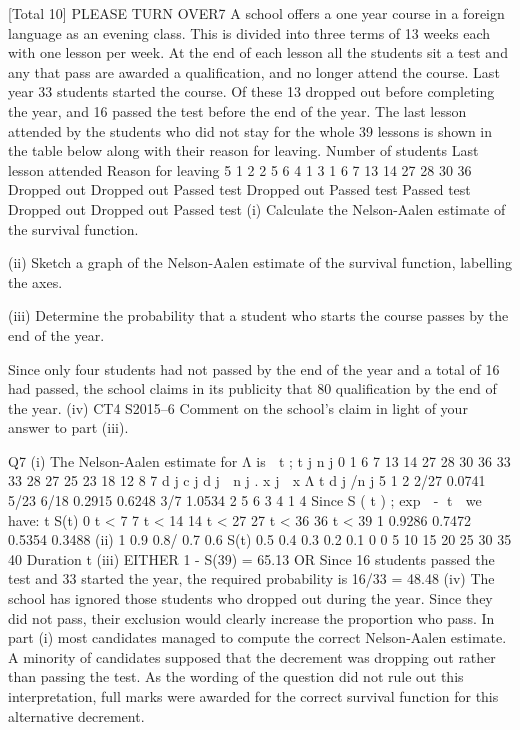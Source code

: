 [Total 10]
PLEASE TURN OVER7
A school offers a one year course in a foreign language as an evening class. This is divided into three terms of 13 weeks each with one lesson per week. At the end of
each lesson all the students sit a test and any that pass are awarded a qualification, and no longer attend the course.
Last year 33 students started the course. Of these 13 dropped out before completing the year, and 16 passed the test before the end of the year. The last lesson attended by
the students who did not stay for the whole 39 lessons is shown in the table below along with their reason for leaving.
Number of
students Last lesson
attended Reason for
leaving
5
1
2
2
5
6
4
1
3 1
6
7
13
14
27
28
30
36 Dropped out
Dropped out
Passed test
Dropped out
Passed test
Passed test
Dropped out
Dropped out
Passed test
(i) Calculate the Nelson-Aalen estimate of the survival function.

(ii) Sketch a graph of the Nelson-Aalen estimate of the survival function, labelling
the axes.

(iii) Determine the probability that a student who starts the course passes by the
end of the year.

Since only four students had not passed by the end of the year and a total of 16 had
passed, the school claims in its publicity that 80%
qualification by the end of the year.
(iv)
CT4 S2015–6
Comment on the school’s claim in light of your answer to part (iii).

Q7
(i)
The Nelson-Aalen estimate for Λ is  t ;\+\;
t j n j
0
1
6
7
13
14
27
28
30
36 33
33
28
27
25
23
18
12
8
7
d j
c j
d j
 n j .
x j  x
Λ t
d j /n j
5
1
2
2/27 0.0741
5/23
6/18 0.2915
0.6248
3/7 1.0534
2
5
6
3
4
1
4
Since S ( t ) ;\+\; exp  - t  we have:
t S(t)
0 \leq t < 7
7 \leq t < 14
14 \leq t < 27
27 \leq t < 36
36 \leq t < 39 1
0.9286
0.7472
0.5354
0.3488
(ii)
1
0.9
0.8/
0.7
0.6
S(t) 0.5
0.4
0.3
0.2
0.1
0
0
5
10
15
20
25
30
35
40
Duration t
(iii)
EITHER
1 - S(39) = 65.13%
OR
Since 16 students passed the test and 33 started the year, the required
probability is 16/33 = 48.48%
(iv)
The school has ignored those students who dropped out during the year.
Since they did not pass, their exclusion would clearly increase the proportion
who pass.
In part (i) most candidates managed to compute the correct Nelson-Aalen
estimate. A minority of candidates supposed that the decrement was
dropping out rather than passing the test. As the wording of the question did
not rule out this interpretation, full marks were awarded for the correct survival
function for this alternative decrement.
